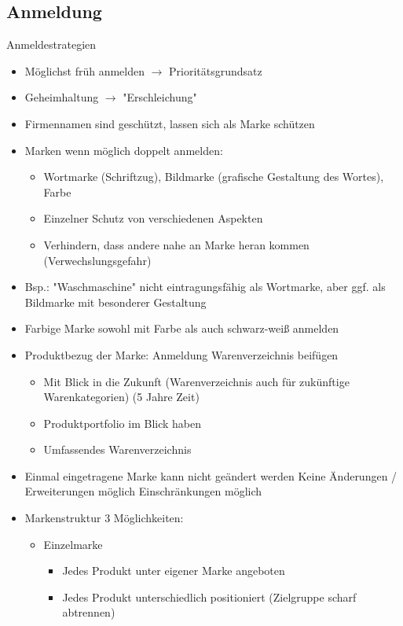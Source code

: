 \documentclass{report}
\begin{document}
\subsection{Anmeldung}
Anmeldestrategien
\begin{itemize}
	\item Möglichst früh anmelden $\rightarrow$ Prioritätsgrundsatz
	\item Geheimhaltung $\rightarrow$ "Erschleichung"
	\item Firmennamen sind geschützt, lassen sich als Marke schützen
	\item Marken wenn möglich doppelt anmelden:
	\begin{itemize}
		\item Wortmarke (Schriftzug), Bildmarke (grafische Gestaltung des Wortes), Farbe
		\item Einzelner Schutz von verschiedenen Aspekten
		\item Verhindern, dass andere nahe an Marke heran kommen (Verwechslungsgefahr)
	\end{itemize}
	\item Bsp.: "Waschmaschine" nicht eintragungsfähig als Wortmarke, aber ggf. als Bildmarke mit besonderer Gestaltung
	\item Farbige Marke sowohl mit Farbe als auch schwarz-weiß anmelden
	\item Produktbezug der Marke: Anmeldung Warenverzeichnis beifügen
	\begin{itemize}
		\item Mit Blick in die Zukunft (Warenverzeichnis auch für zukünftige Warenkategorien) (5 Jahre Zeit)
		\item Produktportfolio im Blick haben
		\item Umfassendes Warenverzeichnis
	\end{itemize}
	\item Einmal eingetragene Marke kann nicht geändert werden
	\newline Keine Änderungen / Erweiterungen möglich
	\newline Einschränkungen möglich
	\item Markenstruktur 3 Möglichkeiten:
	\begin{itemize}
		\item Einzelmarke
		\begin{itemize}
			\item Jedes Produkt unter eigener Marke angeboten
			\item Jedes Produkt unterschiedlich positioniert (Zielgruppe scharf abtrennen)

\end{itemize}
\end{itemize}
\end{itemize}
\end{document}
